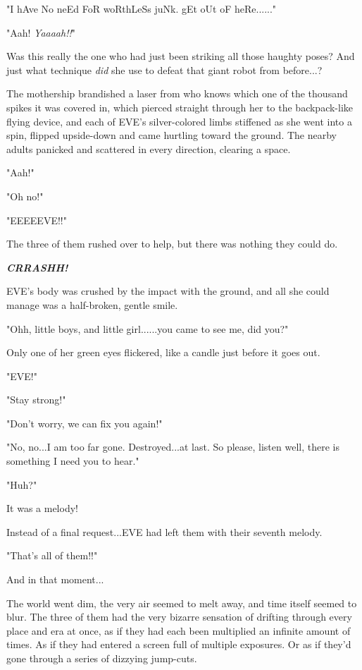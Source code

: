 \documentclass[
]{article}
\begin{document}
"I hAve No neEd FoR woRthLeSs juNk. gEt oUt oF heRe......"

"Aah! \emph{Yaaaah!!}"

Was this really the one who had just been striking all those haughty
poses? And just what technique \emph{did} she use to defeat that giant
robot from before...?

The mothership brandished a laser from who knows which one of the
thousand spikes it was covered in, which pierced straight through her to
the backpack-like flying device, and each of EVE's silver-colored limbs
stiffened as she went into a spin, flipped upside-down and came hurtling
toward the ground. The nearby adults panicked and scattered in every
direction, clearing a space.

"Aah!"

"Oh no!"

"EEEEEVE!!"

The three of them rushed over to help, but there was nothing they could
do.

\emph{\textbf{CRRASHH!}}

EVE's body was crushed by the impact with the ground, and all she could
manage was a half-broken, gentle smile.

"Ohh, little boys, and little girl......you came to see me, did you?"

Only one of her green eyes flickered, like a candle just before it goes
out.

"EVE!"

"Stay strong!"

"Don't worry, we can fix you again!"

"No, no...I am too far gone. Destroyed...at last. So please, listen
well, there is something I need you to hear."

"Huh?"

It was a melody!

Instead of a final request...EVE had left them with their seventh
melody.

"That's all of them!!"

And in that moment...

The world went dim, the very air seemed to melt away, and time itself
seemed to blur. The three of them had the very bizarre sensation of
drifting through every place and era at once, as if they had each been
multiplied an infinite amount of times. As if they had entered a screen
full of multiple exposures. Or as if they'd gone through a series of
dizzying jump-cuts.
\end{document}
